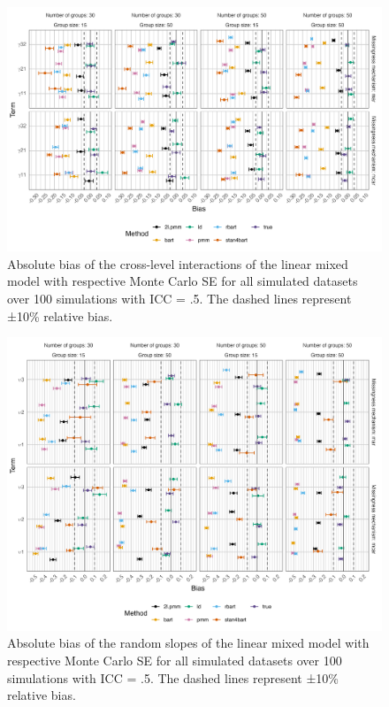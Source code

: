 \documentclass[preprint,12pt]{elsarticle}
\begin{document}
\begin{figure}[H]
    \centering
    \includegraphics[width=1\textwidth]{biascrosslevel.png}
    \caption{Absolute bias of the cross-level interactions of the linear mixed model with respective Monte Carlo SE for all simulated datasets over 100 simulations with ICC = .5. The dashed lines represent ±10\% relative bias.}
    \label{fig:biascrosslevel}
\end{figure}

\begin{figure}[H]
    \centering
    \includegraphics[width=1\textwidth]{biasrandom.png}
    \caption{Absolute bias of the random slopes of the linear mixed model with respective Monte Carlo SE for all simulated datasets over 100 simulations with ICC = .5. The dashed lines represent ±10\% relative bias.}
    \label{fig:biasrandom}
\end{figure}
\end{document}
